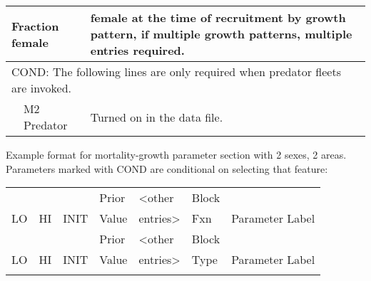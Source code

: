 \begin{longtable}{p{1cm} p{2.25cm} p{10cm}}
	\multicolumn{2}{l}{Fraction female}\Tstrut & \raisebox{0.1\ht\strutbox}{\hypertarget{SexRatio}{Fraction}} female at the time of recruitment by growth pattern, if multiple growth patterns, multiple entries required. \Bstrut\\
	\hline
	
	\multicolumn{3}{l}{COND: The following lines are only required when predator fleets are invoked.} \Tstrut\\
	& M2 Predator & Turned on in the data file. \\
	\hline
\end{longtable}


Example format for mortality-growth parameter section with 2 sexes, 2 areas.
Parameters marked with COND are conditional on selecting that feature:
\begin{longtable}{p{1.1cm} p{1.1cm} p{1.1cm} p{1.1cm} p{1.5cm} p{1.1cm} p{6.75cm}}
	\hline
	   &	&	   & Prior & <other & Block & \Tstrut\\
	LO & HI & INIT & Value & entries> & Fxn & Parameter Label \Bstrut\\
	\hline
	\endfirsthead

	\hline
	   &	&	   & Prior & <other & Block & \Tstrut\\
	LO & HI & INIT & Value & entries> & Type & Parameter Label \Bstrut\\
	\hline
	\endhead

	\hline
	\endfoot

	\endlastfoot


\end{longtable}
